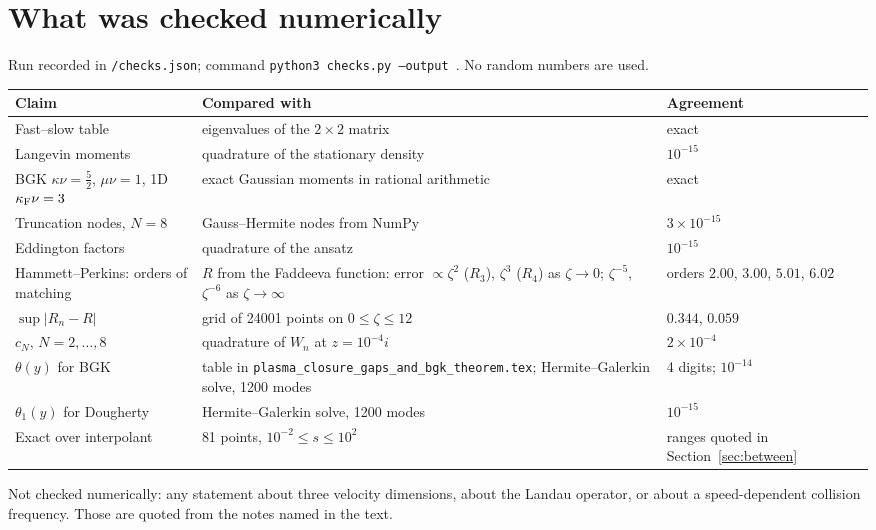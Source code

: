 \section{What was checked numerically}
\label{app:checks}

Run recorded in \texttt{\rundir/checks.json}; command
\texttt{python3 checks.py --output \rundir}. No random numbers are used.
\begin{center}
\renewcommand{\arraystretch}{1.25}
\begin{tabularx}{\textwidth}{@{}P{4.2cm}YP{3.2cm}@{}}
\toprule
Claim & Compared with & Agreement \\
\midrule
Fast--slow table & eigenvalues of the $2\times2$ matrix & exact \\
Langevin moments & quadrature of the stationary density & $10^{-15}$ \\
BGK $\kappa\nu=\tfrac52$, $\mu\nu=1$, 1D $\kappa_{\mathrm F}\nu=3$
  & exact Gaussian moments in rational arithmetic & exact \\
Truncation nodes, $N=8$ & Gauss--Hermite nodes from NumPy
  & $3\times10^{-15}$ \\
Eddington factors & quadrature of the ansatz & $10^{-15}$ \\
Hammett--Perkins: orders of matching
  & $R$ from the Faddeeva function: error $\propto\zeta^2$ ($R_3$),
    $\zeta^3$ ($R_4$) as $\zeta\to0$; $\zeta^{-5}$, $\zeta^{-6}$ as
    $\zeta\to\infty$
  & orders $2.00$, $3.00$, $5.01$, $6.02$ \\
$\sup|R_n-R|$ & grid of 24001 points on $0\le\zeta\le12$ & $0.344$, $0.059$ \\
$c_N$, $N=2,\dots,8$ & quadrature of $W_n$ at $z=10^{-4}i$
  & $2\times10^{-4}$ \\
$\theta(y)$ for BGK & table in
  \texttt{plasma\_closure\_gaps\_and\_bgk\_theorem.tex}; Hermite--Galerkin
  solve, 1200 modes
  & 4 digits; $10^{-14}$ \\
$\theta_1(y)$ for Dougherty & Hermite--Galerkin solve, 1200 modes
  & $10^{-15}$ \\
Exact over interpolant & 81 points, $10^{-2}\le s\le10^2$
  & ranges quoted in Section~\ref{sec:between} \\
\bottomrule
\end{tabularx}
\end{center}
Not checked numerically: any statement about three velocity dimensions,
about the Landau operator, or about a speed-dependent collision frequency.
Those are quoted from the notes named in the text.
